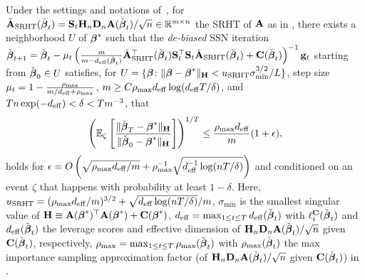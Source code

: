 \documentclass[11pt,a4paper]{article}
\begin{document}
\begin{corollary}\label{coro:ssn_SRHT}
Under the settings and notations of~,
for $\tilde{\mathbf{A}}_{\rm SRHT}(\check{\boldsymbol{\beta}}_t)= \mathbf{S}_t\mathbf{H}_n\mathbf{D}_n\mathbf{A}(\check{\boldsymbol{\beta}}_t)/\sqrt{n}  \in {\mathbb{R}}^{m \times n}$ the SRHT of $\mathbf{A}$ as in , there exists a neighborhood $U$ of $\boldsymbol{\beta}^{\ast}$ such that the \emph{de-biased} SSN iteration $ \check{\boldsymbol{\beta}}_{t+1}= \check{\boldsymbol{\beta}}_{t}-\mu_t \left(\frac{m}{m-d_{\mathrm{eff}}(\check{\boldsymbol{\beta}}_t)}\tilde{\mathbf{A}}_{\rm SRHT}^\top(\check{\boldsymbol{\beta}}_t) \mathbf{S}_t^\top  \mathbf{S}_t \tilde{\mathbf{A}}_{\rm SRHT}(\check{\boldsymbol{\beta}}_t)+\mathbf{C}(\check{\boldsymbol{\beta}}_t) \right)^{-1}\mathbf{g}_t$ starting from $\check{\boldsymbol{\beta}}_0 \in U$ satisfies, for $U=\{\boldsymbol{\beta} \colon \|\boldsymbol{\beta}-\boldsymbol{\beta}^{\ast}\|_{\mathbf{H}}<u_{\rm SRHT}\sigma_{\min}^{3/2}/L\}$, step size $\mu_t=1-\frac{\rho_{\max} }{m/d_{\mathrm{eff}} + \rho_{\max} }$, $m\geq C\rho_{\max} d_{\mathrm{eff}}\log(d_{\mathrm{eff}}T/\delta ) $, and $Tn \exp(-d_{\mathrm{eff}}) < \delta < Tm^{-3}$, that
\begin{equation}\label{eq:SSN_SRHT_scalar_debiasing}
   \left( {\mathbb{E}}_{\zeta}\left[\frac{\|\check{\boldsymbol{\beta}}_T-\boldsymbol{\beta}^{\ast}\|_{\mathbf{H}}}{\|\check{\boldsymbol{\beta}}_0-\boldsymbol{\beta}^{\ast}\|_{\mathbf{H}}}\right]\right)^{1/T}\leq \frac{\rho_{\max} d_{\mathrm{eff}}}{m} ( 1+\epsilon), 
\end{equation}
holds for $\epsilon= O\left(\sqrt{\rho_{\max} d_{\mathrm{eff}}/m} +\rho^{-1}_{\max} \sqrt{d_{\mathrm{eff}}^{-1}\log(nT/\delta)}\right)$  and conditioned on an event $\zeta$ that happens with probability at least $1-\delta$. Here, $u_{\rm SRHT}=(\rho_{\max} d_{\mathrm{eff}} /m)^{3/2}+\sqrt{d_{\mathrm{eff}} \log(nT/\delta)}/m $, $\sigma_{\min}$ is the smallest singular value of $\mathbf{H} \equiv\mathbf{A}(\boldsymbol{\beta}^{\ast})^\top \mathbf{A}(\boldsymbol{\beta}^{\ast})+\mathbf{C}(\boldsymbol{\beta}^{\ast})$, $d_{\mathrm{eff}}=\max_{1\leq t \leq T}d_{\mathrm{eff}}(\check{\boldsymbol{\beta}}_t)$ with $\ell_{i}^{\mathbf{C}}(\check{\boldsymbol{\beta}}_t)$ and  $d_{\mathrm{eff}}(\check{\boldsymbol{\beta}}_t)$ the leverage scores and effective dimension of $\mathbf{H}_n\mathbf{D}_n\mathbf{A}(\check{\boldsymbol{\beta}}_t)/\sqrt{n}$ given $\mathbf{C}(\check{\boldsymbol{\beta}}_t)$, respectively, $\rho_{\max}=\max_{1\leq t \leq T}\rho_{\max}(\check{\boldsymbol{\beta}}_t)$  with $\rho_{\max}(\check{\boldsymbol{\beta}}_t)$ the max  importance sampling  approximation factor (of $\mathbf{H}_n\mathbf{D}_n\mathbf{A}(\check{\boldsymbol{\beta}}_t)/\sqrt{n}$ given $\mathbf{C}(\check{\boldsymbol{\beta}}_t)$) in . 
\end{corollary}
\end{document}
